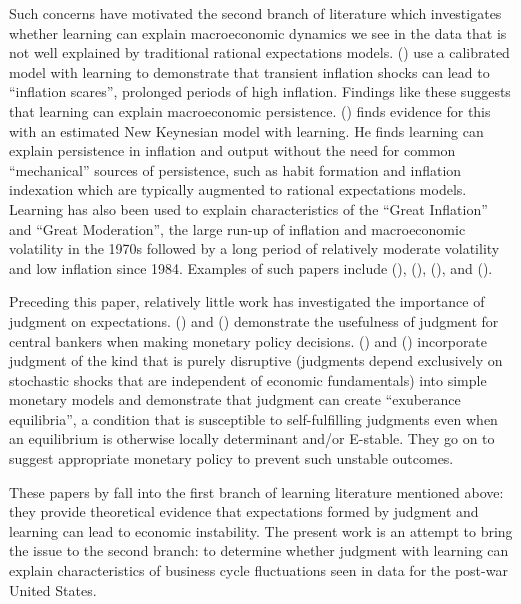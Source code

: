 \documentclass[10pt]{article}
\newcommand{\citee}[1]{\citeauthor*{#1} (\citeyear{#1})}
\begin{document}
Such concerns have motivated the second branch of literature which investigates whether learning can explain macroeconomic dynamics we see in the data that is not well explained by traditional rational expectations models.  \citee{ow2005} use a calibrated model with learning to demonstrate that transient inflation shocks can lead to ``inflation scares'', prolonged periods of high inflation.  Findings like these suggests that learning can explain macroeconomic persistence.  \citee{milani2007} finds evidence for this with an estimated New Keynesian model with learning.  He finds learning can explain persistence in inflation and output without the need for common ``mechanical'' sources of persistence, such as habit formation and inflation indexation which are typically augmented to rational expectations models.  Learning has also been used to explain characteristics of the ``Great Inflation'' and ``Great Moderation'', the large run-up of inflation and macroeconomic volatility in the 1970s followed by a long period of relatively moderate volatility and low inflation since 1984.  Examples of such papers include \citee{ow2005b}, \citee{primiceri2006}, \citee{bullardeusepi2005}, and \citee{bullardsingh}.

Preceding this paper, relatively little work has investigated the importance of judgment on expectations.  \citee{rsw1997} and \citee{svensson2005} demonstrate the usefulness of judgment for central bankers when making monetary policy decisions.  \citeauthor*{beh2008} (\citeyear{beh2008}) and (\citeyear{beh2010}) incorporate judgment of the kind that is purely disruptive (judgments depend exclusively on stochastic shocks that are independent of economic fundamentals) into simple monetary models and demonstrate that judgment can create ``exuberance equilibria'', a condition that is susceptible to self-fulfilling judgments even when an equilibrium is otherwise locally determinant and/or E-stable.  They go on to suggest appropriate monetary policy to prevent such unstable outcomes.   

These papers by \citeauthor*{beh2008} fall into the first branch of learning literature mentioned above: they provide theoretical evidence that expectations formed by judgment and learning can lead to economic instability.  The present work is an attempt to bring the issue to the second branch: to determine whether judgment with learning can explain characteristics of business cycle fluctuations seen in data for the post-war United States. 
\end{document}

